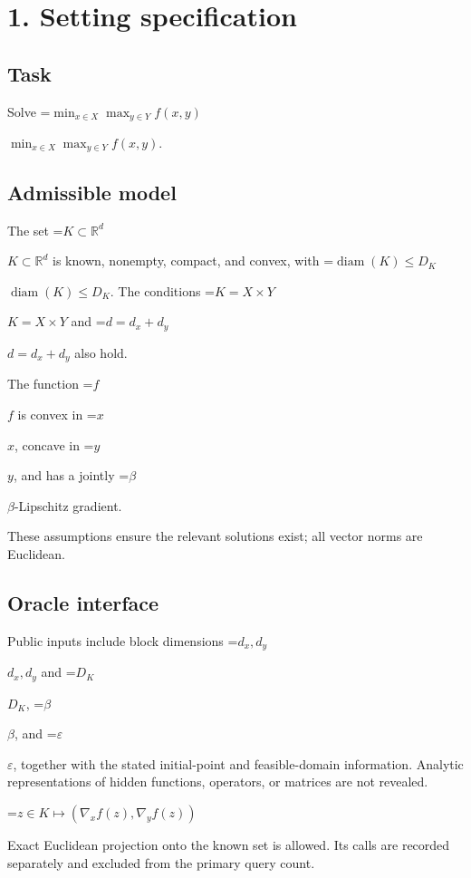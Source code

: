 \documentclass[10pt,a4paper]{article}
\newcommand{\AtlasMath}[1]{\par\begingroup\centering\setbox0=\hbox{$\displaystyle #1$}\ifdim\wd0>1.4\linewidth\typeout{ATLAS WIDE FORMULA: \the\wd0}\fi\ifdim\wd0>\linewidth\resizebox{\linewidth}{!}{\box0}\else\box0\fi\par\endgroup}
\newcommand{\AtlasInlineMath}[1]{\begingroup\setbox0=\hbox{$#1$}\ifdim\wd0>.4\linewidth\endgroup\AtlasMath{#1}\else\endgroup$#1$\fi}
\begin{document}
\section{1. Setting specification}


\subsection{Task}


Solve \AtlasInlineMath{\min_{x\in X}\max_{y\in Y}f(x,y)}.



\subsection{Admissible model}


The set \AtlasInlineMath{K\subset\mathbb{R}^d} is known, nonempty, compact, and convex, with \AtlasInlineMath{\operatorname{diam}(K)\le D_K}. The conditions \AtlasInlineMath{K=X\times Y} and \AtlasInlineMath{d=d_x+d_y} also hold.



The function \AtlasInlineMath{f} is convex in \AtlasInlineMath{x}, concave in \AtlasInlineMath{y}, and has a jointly \AtlasInlineMath{\beta}-Lipschitz gradient.



These assumptions ensure the relevant solutions exist; all vector norms are Euclidean.



\subsection{Oracle interface}


Public inputs include block dimensions \AtlasInlineMath{d_x,d_y} and \AtlasInlineMath{D_K}, \AtlasInlineMath{\beta}, and \AtlasInlineMath{\varepsilon}, together with the stated initial-point and feasible-domain information. Analytic representations of hidden functions, operators, or matrices are not revealed.




\AtlasMath{z\in K\longmapsto (\nabla_x f(z),\nabla_y f(z))}




Exact Euclidean projection onto the known set is allowed. Its calls are recorded separately and excluded from the primary query count.
\end{document}
